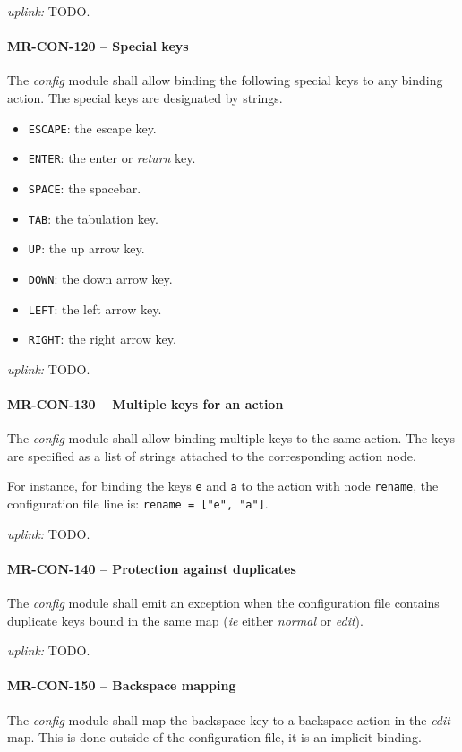 \textit{uplink: } TODO.

\paragraph{MR-CON-120 -- Special keys}
The \emph{config} module shall allow binding the following special
keys to any binding action. The special keys are designated by strings.
\begin{itemize}
\item \lstinline{ESCAPE}: the escape key.
\item \lstinline{ENTER}: the enter or \emph{return} key.
\item \lstinline{SPACE}: the spacebar.
\item \lstinline{TAB}: the tabulation key.
\item \lstinline{UP}: the up arrow key.
\item \lstinline{DOWN}: the down arrow key.
\item \lstinline{LEFT}: the left arrow key.
\item \lstinline{RIGHT}: the right arrow key.
\end{itemize}

\textit{uplink: } TODO.

\paragraph{MR-CON-130 -- Multiple keys for an action}
The \emph{config} module shall allow binding multiple keys to the
same action. The keys are specified as a list of strings attached
to the corresponding action node.

For instance, for binding the keys \lstinline{e} and \lstinline{a}
to the action with node \lstinline{rename}, the configuration file
line is: \lstinline{rename = ["e", "a"]}.

\textit{uplink: } TODO.

\paragraph{MR-CON-140 -- Protection against duplicates}
The \emph{config} module shall emit an exception when the configuration
file contains duplicate keys bound in the same map (\textit{ie} either
\emph{normal} or \emph{edit}).

\textit{uplink: } TODO.

\paragraph{MR-CON-150 -- Backspace mapping}
The \emph{config} module shall map the backspace key to a backspace
action in the \emph{edit} map. This is done outside of the configuration
file, it is an implicit binding.

